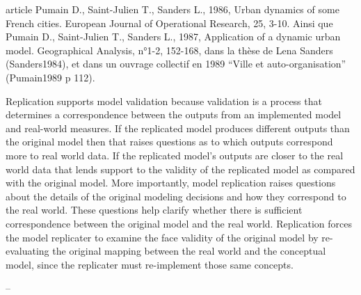 



article Pumain D., Saint-Julien T., Sanders L., 1986, Urban dynamics of some French cities. European Journal of Operational Research, 25, 3-10. Ainsi que Pumain D., Saint-Julien T., Sanders L., 1987, Application of a dynamic urban model. Geographical Analysis, n°1-2, 152-168, dans la thèse de Lena Sanders (Sanders1984), et dans un ouvrage collectif en 1989 “Ville et auto-organisation” (Pumain1989 p 112).


Replication supports model validation because validation is a process that determines a correspondence between the outputs from an implemented model and real-world measures. If the replicated model produces different outputs than the original model then that raises questions as to which outputs correspond more to real world data. If the replicated model's outputs are closer to the real world data that lends support to the validity of the replicated model as compared with the original model. More importantly, model replication raises questions about the details of the original modeling decisions and how they correspond to the real world. These questions help clarify whether there is sufficient correspondence between the original model and the real world. Replication forces the model replicater to examine the face validity of the original model by re-evaluating the original mapping between the real world and the conceptual model, since the replicater must re-implement those same concepts.

--



